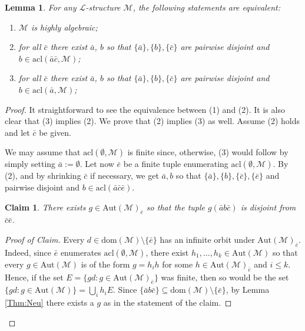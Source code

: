 \documentclass[11pt]{amsart}
\theoremstyle{plain}
\newtheorem{lemma}[theorem]{Lemma}
\newtheorem{claim}[theorem]{Claim}
\theoremstyle{definition}
\begin{document}
\begin{lemma}\label{L:aris1.3}
For any   $\mathcal{L}$-structure $\mathcal{M}$,  the following statements are equivalent:
 \begin{enumerate}
     \item  $\mathcal{M}$  is highly algebraic;
     \item for all  $\bar{c}$ there exist $\bar{a}$, $b$ so that $\{\bar{a}\}, \{b\}, \{\bar{c}\}$ are pairwise disjoint and $b\in\mathrm{acl}(\bar{a}\bar{c},\mathcal{M})$; 
      \item for all  $\bar{c}$ there exist  $\bar{a}$, $b$ so that $\{\bar{a}\}, \{b\}, \{\bar{c}\}$ are pairwise disjoint and $b\in\mathrm{acl}(\bar{a},\mathcal{M})$; 
 \end{enumerate}
\end{lemma}
\begin{proof}
 It straightforward to see the equivalence between (1) and (2).  It is also clear that (3) implies (2). We prove that (2) implies (3) as well. Assume (2) holds and let $\bar{c}$ be given.

We may assume that $\mathrm{acl}(\emptyset,\mathcal{M})$ is finite since, otherwise, (3) would follow by simply setting  $\bar{a}:=\emptyset$. Let now $\bar{e}$ be a finite tuple enumerating $\mathrm{acl}(\emptyset,\mathcal{M})$. By (2), and by shrinking  $\bar{c}$ if necessary, we get $\bar{a}, b$ so that $\{\bar{a}\}, \{b\}, \{\bar{c}\}, \{\bar{e}\}$ and pairwise disjoint and $b\in\mathrm{acl}(\bar{a}\bar{c}\bar{e})$. 
\begin{claim}
There exists $g\in\mathrm{Aut}(\mathcal{M})_{\bar{e}}$ so that the tuple $g(\bar{a}b\bar{c})$ is disjoint from  $\bar{c}\bar{e}$.
\end{claim}
\begin{proof}[Proof of Claim]
Every $d\in\mathrm{dom}(\mathcal{M})\setminus \{\bar{e}\}$ has an infinite orbit  under  $\mathrm{Aut}(\mathcal{M})_{\bar{e}}$. Indeed, since $\bar{e}$ enumerates $\mathrm{acl}(\emptyset,\mathcal{M})$, there exist $h_1,\ldots,h_k \in \mathrm{Aut}(\mathcal{M})$ so that  every $g\in \mathrm{Aut}(\mathcal{M})$ is of the form $g=h_ih$ for some $h\in \mathrm{Aut}(\mathcal{M})_{\bar{e}}$ and $i\leq k$. Hence, if the set $E=\{gd \colon g\in  \mathrm{Aut}(\mathcal{M})_{\bar{e}} \}$ was finite, then so would be  the set $\{gd \colon g\in  \mathrm{Aut}(\mathcal{M})\}=\bigcup_i h_iE$.
Since  $\{\bar{a}b\bar{c}\}\subseteq\mathrm{dom}(\mathcal{M})\setminus \{\bar{e}\}$, by Lemma \ref{Thm:Neu} there exists a $g$ as in the statement of the claim.
\end{proof}


\end{proof}
\end{document}
